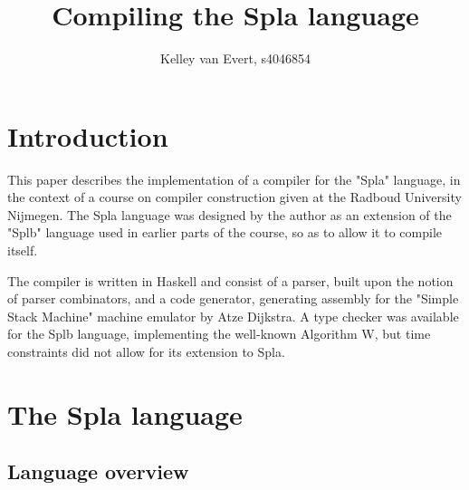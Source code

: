 \documentclass[english,10pt]{article} %
\title{Compiling the Spla language}
\author{Kelley van Evert, s4046854}
\theoremstyle{definitionstyle}
\theoremstyle{lemmastyle}
\begin{document}
\maketitle


\setcounter{tocdepth}{2} %
\tableofcontents

\section{Introduction}

This paper describes the implementation of a compiler for the "Spla" language, in the context of a course on compiler construction given at the Radboud University Nijmegen. The Spla language was designed by the author as an extension of the "Splb" language used in earlier parts of the course, so as to allow it to compile itself.

The compiler is written in Haskell and consist of a parser, built upon the notion of parser combinators, and a code generator, generating assembly for the "Simple Stack Machine" machine emulator by Atze Dijkstra. A type checker was available for the Splb language, implementing the well-known Algorithm W, but time constraints did not allow for its extension to Spla.


\section{The Spla language}

\subsection{Language overview}
\end{document}
